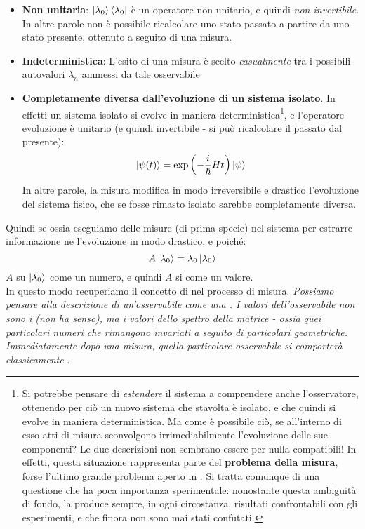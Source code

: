 \documentclass[../../FisicaTeorica.tex]{subfiles}
\begin{document}
\begin{itemize}
    \item \textbf{Non unitaria}: $\Ket{\lambda_0}\Bra{\lambda_0}$ è un operatore non unitario, e quindi \textit{non invertibile}. In altre parole non è possibile ricalcolare uno stato passato a partire da uno stato presente, ottenuto a seguito di una misura.
    \item \textbf{Indeterministica}: L'esito di una misura è scelto \textit{casualmente} tra i possibili autovalori $\lambda_n$ ammessi da tale osservabile
    \item \textbf{Completamente diversa dall'evoluzione di un sistema isolato}. In effetti un sistema isolato si evolve in maniera deterministica\footnote{Si potrebbe pensare di \textit{estendere} il sistema a comprendere anche l'osservatore, ottenendo per ciò un nuovo sistema che stavolta è isolato, e che quindi si evolve in maniera deterministica. Ma come è possibile ciò, se all'interno di esso atti di misura sconvolgono irrimediabilmente l'evoluzione delle sue componenti? Le due descrizioni non sembrano essere per nulla compatibili! In effetti, questa situazione rappresenta parte del \textbf{problema della misura}, forse l'ultimo grande problema aperto in \MQ. Si tratta comunque di una questione che ha poca importanza sperimentale: nonostante questa ambiguità di fondo, la \MQ produce sempre, in ogni circostanza, risultati confrontabili con gli esperimenti, e che finora non sono mai stati confutati.}, e l'operatore evoluzione è unitario (e quindi invertibile - si può ricalcolare il passato dal presente):
    \[
    \Ket{\psi(t)}=\exp\left(-\frac{i}{\hbar}Ht\right)\Ket{\psi}
    \]
    In altre parole, la misura modifica in modo irreversibile e drastico l'evoluzione del sistema fisico, che se fosse rimasto isolato sarebbe completamente diversa.
\end{itemize}
Quindi se  ossia eseguiamo delle misure (di prima specie) nel sistema per estrarre informazione ne  l'evoluzione in modo drastico, e poiché:
\[
A\Ket{\lambda_0}=\lambda_0\Ket{\lambda_0}
\]
$A$ su $\Ket{\lambda_0}$  come un numero, e quindi $A$ si  come un valore.\\
In questo modo recuperiamo il concetto di  nel processo di misura.%
\textit{Possiamo pensare alla descrizione di un'osservabile come una . I valori dell'osservabile non sono i  (non ha senso), ma i valori dello spettro della matrice - ossia quei particolari numeri che rimangono invariati a seguito di particolari  geometriche. Immediatamente dopo una misura, quella particolare osservabile si comporterà \textit{classicamente} }.\\
\end{document}
